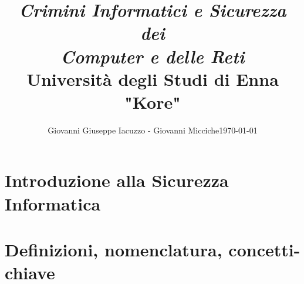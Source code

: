 \documentclass[a4paper,12pt]{article}
\title{
    \vspace{-2em}
    \textit{\LARGE Crimini Informatici e Sicurezza dei \\ Computer e delle Reti}\\[1em]
    {\large Università degli Studi di Enna "Kore"}
}
\author{Giovanni Giuseppe Iacuzzo - Giovanni Micciche\hfill \today}
\date{}
\begin{document}
\sloppy
\setcounter{secnumdepth}{3}
\setcounter{tocdepth}{3}

\maketitle
\onehalfspacing



\newpage
\section{Introduzione alla Sicurezza Informatica}


\newpage
\section{Definizioni, nomenclatura, concetti-chiave}

\end{document}
